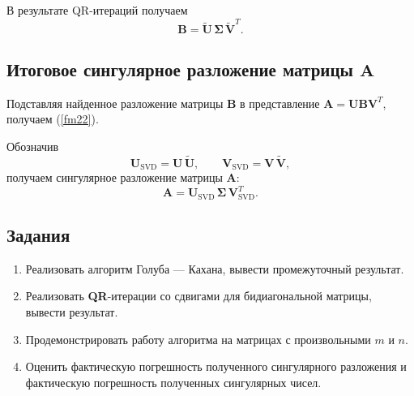 \documentclass[12pt]{article}
\begin{document}
	В результате QR-итераций получаем
	\begin{equation}
	\mathbf{B}
	= \widetilde{\mathbf{U}}\,
	\boldsymbol{\Sigma}\,
	\widetilde{\mathbf{V}}^{T}.
\end{equation}
	
	\subsection*{Итоговое сингулярное разложение матрицы {$\mathbf{A}$}}
	
	Подставляя найденное разложение матрицы $\mathbf{B}$ в представление
	$\mathbf{A} = \mathbf{U}\mathbf{B}\mathbf{V}^{T}$, получаем (\ref{fm22}).
	
	Обозначив
	\begin{equation}
	\mathbf{U}_{\mathrm{SVD}} = \mathbf{U}\,\widetilde{\mathbf{U}},
	\qquad
	\mathbf{V}_{\mathrm{SVD}} = \mathbf{V}\,\widetilde{\mathbf{V}},
\end{equation}
	получаем сингулярное разложение матрицы $\mathbf{A}$:
	\begin{equation}
		\mathbf{A} = \mathbf{U}_{\mathrm{SVD}}\,\boldsymbol{\Sigma}\,
		\mathbf{V}_{\mathrm{SVD}}^{T}.
	\end{equation}
	



	
	
	

	
	\subsection*{Задания}
	
	\begin{enumerate}
		\item Реализовать алгоритм Голуба --- Кахана, вывести промежуточный результат.
		\item Реализовать \textbf{QR}-итерации со сдвигами для бидиагональной матрицы, вывести результат.
		\item Продемонстрировать работу алгоритма на матрицах с произвольными $m$ и $n$.
		\item Оценить фактическую погрешность полученного сингулярного разложения и фактическую погрешность полученных сингулярных чисел.
	\end{enumerate}
\end{document}
